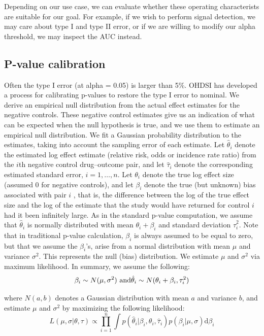 \documentclass[11pt]{book}
\begin{document}
Depending on our use case, we can evaluate whether these operating
characterists are suitable for our goal. For example, if we wish to
perform signal detection, we may care about type I and type II error, or
if we are willing to modify our alpha threshold, we may inspect the AUC
instead.

\subsection{P-value calibration}\label{p-value-calibration}

Often the type I error (at alpha = 0.05) is larger than 5\%. OHDSI has
developed a process for calibrating p-values to restore the type I error
to nominal. \citep{schuemie_2014} We derive an empirical null
distribution from the actual effect estimates for the negative controls.
These negative control estimates give us an indication of what can be
expected when the null hypothesis is true, and we use them to estimate
an empirical null distribution. We fit a Gaussian probability
distribution to the estimates, taking into account the sampling error of
each estimate. Let \(\hat{\theta}_i\) denote the estimated log effect
estimate (relative risk, odds or incidence rate ratio) from the \(i\)th
negative control drug--outcome pair, and let \(\hat{\tau}_i\) denote the
corresponding estimated standard error, \(i=1,\ldots,n\). Let
\(\theta_i\) denote the true log effect size (assumed 0 for negative
controls), and let \(\beta_i\) denote the true (but unknown) bias
associated with pair \(i\) , that is, the difference between the log of
the true effect size and the log of the estimate that the study would
have returned for control \(i\) had it been infinitely large. As in the
standard p-value computation, we assume that \(\hat{\theta}_i\) is
normally distributed with mean \(\theta_i + \beta_i\) and standard
deviation \(\hat{\tau}_i^2\). Note that in traditional p-value
calculation, \(\beta_i\) is always assumed to be equal to zero, but that
we assume the \(\beta_i\)'s, arise from a normal distribution with mean
\(\mu\) and variance \(\sigma^2\). This represents the null (bias)
distribution. We estimate \(\mu\) and \(\sigma^2\) via maximum
likelihood. In summary, we assume the following:
\[\beta_i \sim N(\mu,\sigma^2) \text{  and} \\ \hat{\theta}_i \sim N(\theta_i + \beta_i, \tau_i^2)\]

where \(N(a,b)\) denotes a Gaussian distribution with mean \(a\) and
variance \(b\), and estimate \(\mu\) and \(\sigma^2\) by maximizing the
following likelihood:
\[L(\mu, \sigma | \theta, \tau) \propto \prod_{i=1}^{n}\int p(\hat{\theta}_i|\beta_i, \theta_i, \hat{\tau}_i)p(\beta_i|\mu, \sigma) \text{d}\beta_i\]
\end{document}
